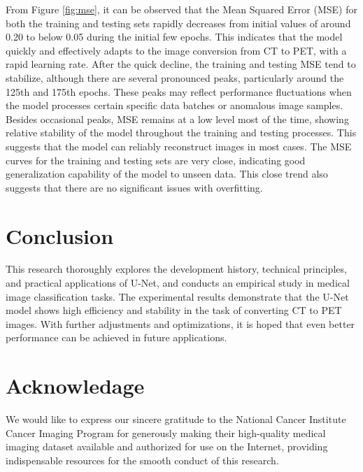 \documentclass[twocolumn]{article}
\begin{document}
From Figure \ref{fig:mse}, it can be observed that the Mean Squared Error (MSE) for both the training and testing sets rapidly decreases from initial values of around 0.20 to below 0.05 during the initial few epochs. This indicates that the model quickly and effectively adapts to the image conversion from CT to PET, with a rapid learning rate. After the quick decline, the training and testing MSE tend to stabilize, although there are several pronounced peaks, particularly around the 125th and 175th epochs. These peaks may reflect performance fluctuations when the model processes certain specific data batches or anomalous image samples. Besides occasional peaks, MSE remains at a low level most of the time, showing relative stability of the model throughout the training and testing processes. This suggests that the model can reliably reconstruct images in most cases. The MSE curves for the training and testing sets are very close, indicating good generalization capability of the model to unseen data. This close trend also suggests that there are no significant issues with overfitting.


\section{Conclusion}
This research thoroughly explores the development history, technical principles, and practical applications of U-Net, and conducts an empirical study in medical image classification tasks. The experimental results demonstrate that the U-Net model shows high efficiency and stability in the task of converting CT to PET images. With further adjustments and optimizations, it is hoped that even better performance can be achieved in future applications.

\section*{Acknowledage}
We would like to express our sincere gratitude to the National Cancer Institute Cancer Imaging Program for generously making their high-quality medical imaging dataset available and authorized for use on the Internet, providing indispensable resources for the smooth conduct of this research.



\end{document}

